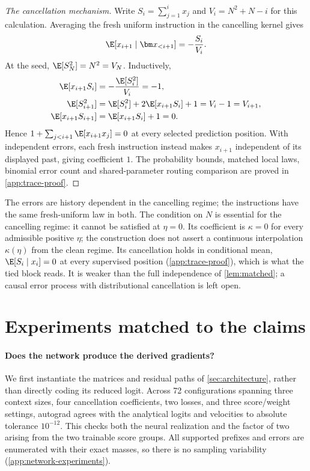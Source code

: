 \begin{proof}[The cancellation mechanism]
Write $S_i=\sum_{j=1}^i x_j$ and $V_i=N^2+N-i$ for this calculation.
Averaging the fresh uniform instruction in the cancelling kernel gives
\[
 \E[x_{i+1}\mid\bm x_{<i+1}]=-\frac{S_i}{V_i}.
\]
At the seed, $\E[S_N^2]=N^2=V_N$. Inductively,
\begin{align*}
 \E[x_{i+1}S_i]&=-\frac{\E[S_i^2]}{V_i}=-1,\\
 \E[S_{i+1}^2]&=\E[S_i^2]+2\E[x_{i+1}S_i]+1=V_i-1=V_{i+1},\\
 \E[x_{i+1}S_{i+1}]&=\E[x_{i+1}S_i]+1=0.
\end{align*}
Hence $1+\sum_{j<i+1}\E[x_{i+1}x_j]=0$ at every selected prediction position.
With independent errors, each fresh instruction instead makes $x_{i+1}$ independent of its displayed past,
giving coefficient $1$.
The probability bounds, matched local laws, binomial error count and shared-parameter routing comparison are proved in \cref{app:trace-proof}.
\end{proof}
The errors are history dependent in the cancelling regime; the instructions have the same fresh-uniform law in both.
The condition on $N$ is essential for the cancelling regime: it cannot be satisfied at $\eta=0$.
Its coefficient is $\kappa=0$ for every admissible positive $\eta$; the construction does not assert a continuous interpolation $\kappa(\eta)$ from the clean regime.
Its cancellation holds in conditional mean, $\E[S_i\mid x_i]=0$ at every supervised position (\cref{app:trace-proof}), which is what the tied block reads.
It is weaker than the full independence of \cref{lem:matched}; a causal error process with distributional cancellation is left open.

\section{Experiments matched to the claims}
\label{sec:numerics}

\paragraph{Does the network produce the derived gradients?}
We first instantiate the matrices and residual paths of \cref{sec:architecture}, rather than directly coding its reduced logit.
Across 72 configurations spanning three context sizes, four cancellation coefficients, two losses, and three score/weight settings,
autograd agrees with the analytical logits and velocities to absolute tolerance $10^{-12}$.
This checks both the neural realization and the factor of two arising from the two trainable score groups.
All supported prefixes and errors are enumerated with their exact masses, so there is no sampling variability (\cref{app:network-experiments}).

